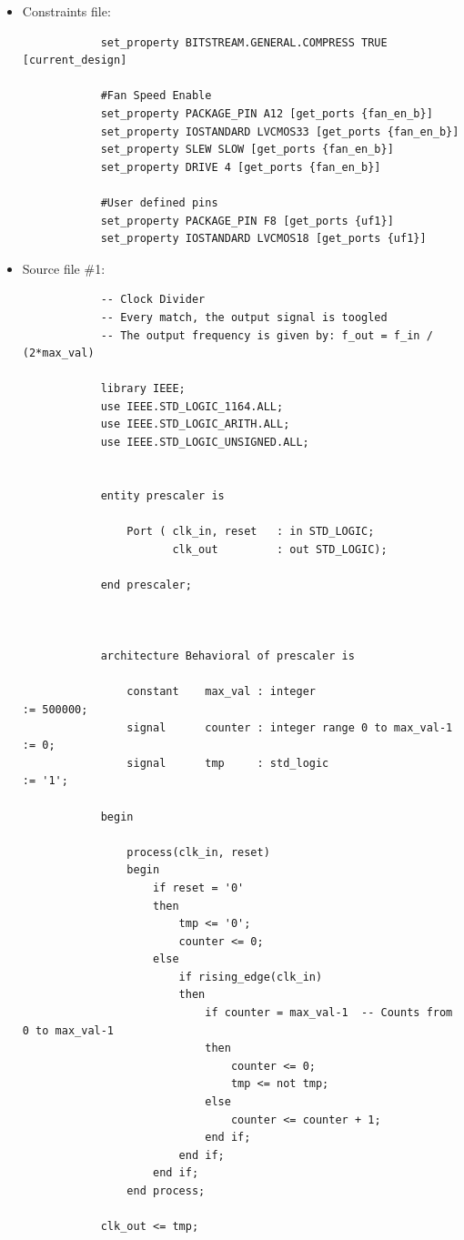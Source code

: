 \begin{itemize}
	\item Constraints file:
		\begin{verbatim}
			set_property BITSTREAM.GENERAL.COMPRESS TRUE [current_design]
			
			#Fan Speed Enable
			set_property PACKAGE_PIN A12 [get_ports {fan_en_b}]
			set_property IOSTANDARD LVCMOS33 [get_ports {fan_en_b}]
			set_property SLEW SLOW [get_ports {fan_en_b}]
			set_property DRIVE 4 [get_ports {fan_en_b}]
			
			#User defined pins
			set_property PACKAGE_PIN F8 [get_ports {uf1}]
			set_property IOSTANDARD LVCMOS18 [get_ports {uf1}]
		\end{verbatim}
	
	\item Source file \#1:
		\begin{verbatim}
			-- Clock Divider
			-- Every match, the output signal is toogled
			-- The output frequency is given by: f_out = f_in / (2*max_val)
			
			library IEEE;
			use IEEE.STD_LOGIC_1164.ALL;
			use IEEE.STD_LOGIC_ARITH.ALL;
			use IEEE.STD_LOGIC_UNSIGNED.ALL;
			
			
			entity prescaler is
			
			    Port ( clk_in, reset   : in STD_LOGIC;
			           clk_out         : out STD_LOGIC);
			
			end prescaler;
			
			
			
			architecture Behavioral of prescaler is
			
			    constant    max_val : integer                       := 500000;  
			    signal      counter : integer range 0 to max_val-1  := 0;
			    signal      tmp     : std_logic                     := '1';
			
			begin
			
			    process(clk_in, reset)
			    begin
			        if reset = '0'
			        then
			            tmp <= '0';
			            counter <= 0;
			        else
			            if rising_edge(clk_in)
			            then
			                if counter = max_val-1  -- Counts from 0 to max_val-1
			                then
			                    counter <= 0;
			                    tmp <= not tmp;
			                else
			                    counter <= counter + 1;
			                end if;
			            end if;
			        end if;
			    end process;
			
			clk_out <= tmp;
			

\end{verbatim}
\end{itemize}
